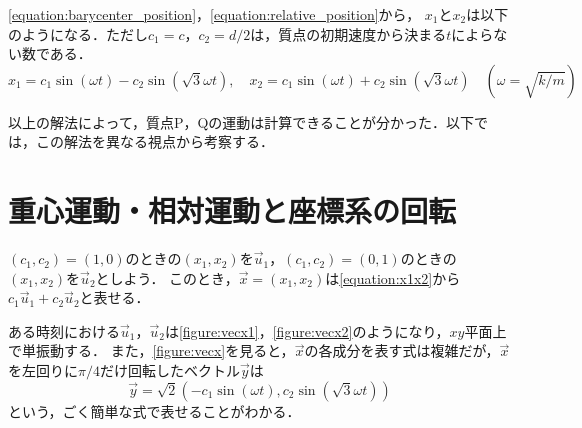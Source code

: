 \documentclass[disablejfam,paper=a5,fontsize=9bp,head_space=20mm,line_length=112mm,number_of_lines=32]{jlreq}
\newcommand{\krez}{\pi}
\begin{document}
\cref{equation:barycenter_position}，\cref{equation:relative_position}から，
\(x_1\)と\(x_2\)は以下のようになる．ただし\(c_1=c\)，\(c_2=d/2\)は，質点の初期速度から決まる\(t\)によらない数である．
\begin{equation}
  \label{equation:x1x2}
  x_1 = c_1\sin(\omega t)-c_2\sin(\sqrt{3}\omega t),
  \quad x_2 = c_1\sin(\omega t)+c_2\sin(\sqrt{3}\omega t)
  \quad(\omega=\sqrt{k/m})
\end{equation}

以上の解法によって，質点P，Qの運動は計算できることが分かった．以下では，この解法を異なる視点から考察する．

\section{重心運動・相対運動と座標系の回転}
\((c_1,c_2)=(1,0)\)のときの\((x_1,x_2)\)を\(\vec{u}_1\)，\((c_1,c_2)=(0,1)\)のときの\((x_1,x_2)\)を\(\vec{u}_2\)としよう．
このとき，\(\vec{x}=(x_1,x_2)\)は\cref{equation:x1x2}から\(c_1\vec{u}_1+c_2\vec{u}_2\)と表せる．

ある時刻における\(\vec{u}_1\)，\(\vec{u}_2\)は\cref{figure:vecx1}，\cref{figure:vecx2}のようになり，\(xy\)平面上で単振動する．
また，\cref{figure:vecx}を見ると，\(\vec{x}\)の各成分を表す式は複雑だが，\(\vec{x}\)を左回りに\(\krez/4\)だけ回転したベクトル\(\vec{y}\)は
\[
  \vec{y} = \sqrt{2}(-c_1\sin(\omega t),c_2\sin(\sqrt{3}\omega t))
\]
という，ごく簡単な式で表せることがわかる．
\end{document}
